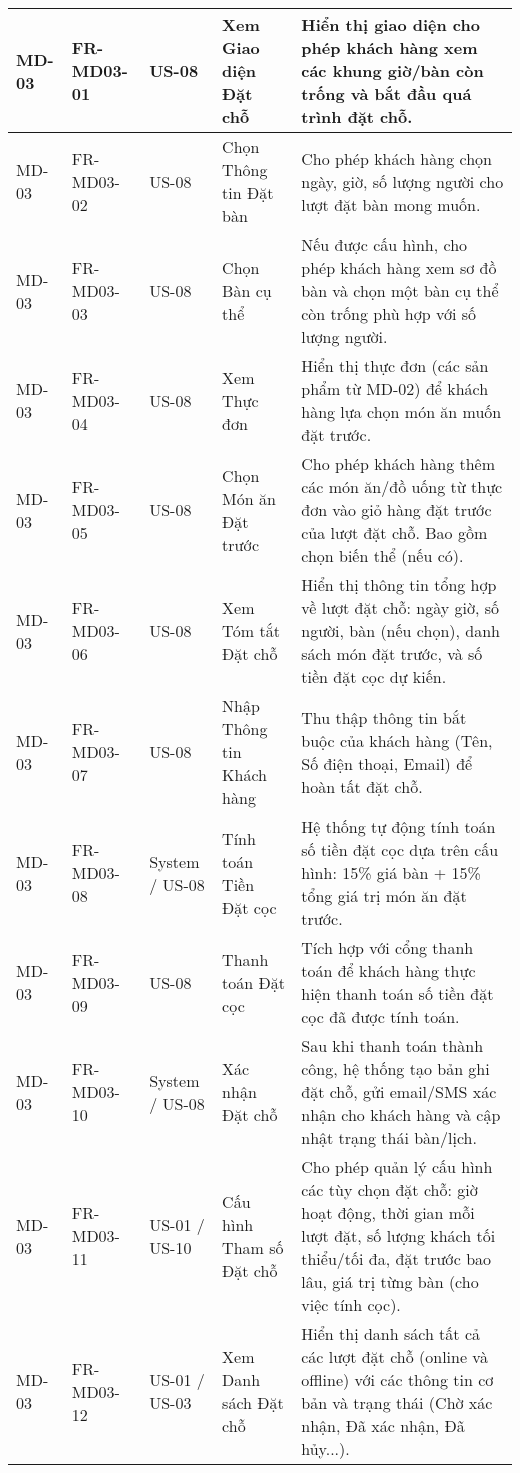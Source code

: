 \begin{longtable}{|m{2cm}|m{2.5cm}|m{2cm}|m{4.5cm}|m{4cm}|}
MD-03 & FR-MD03-01 & US-08 & Xem Giao diện Đặt chỗ & Hiển thị giao diện cho phép khách hàng xem các khung giờ/bàn còn trống và bắt đầu quá trình đặt chỗ. \\
\hline
MD-03 & FR-MD03-02 & US-08 & Chọn Thông tin Đặt bàn & Cho phép khách hàng chọn ngày, giờ, số lượng người cho lượt đặt bàn mong muốn. \\
\hline
MD-03 & FR-MD03-03 & US-08 & Chọn Bàn cụ thể & Nếu được cấu hình, cho phép khách hàng xem sơ đồ bàn và chọn một bàn cụ thể còn trống phù hợp với số lượng người. \\
\hline
MD-03 & FR-MD03-04 & US-08 & Xem Thực đơn & Hiển thị thực đơn (các sản phẩm từ MD-02) để khách hàng lựa chọn món ăn muốn đặt trước. \\
\hline
MD-03 & FR-MD03-05 & US-08 & Chọn Món ăn Đặt trước & Cho phép khách hàng thêm các món ăn/đồ uống từ thực đơn vào giỏ hàng đặt trước của lượt đặt chỗ. Bao gồm chọn biến thể (nếu có). \\
\hline
MD-03 & FR-MD03-06 & US-08 & Xem Tóm tắt Đặt chỗ & Hiển thị thông tin tổng hợp về lượt đặt chỗ: ngày giờ, số người, bàn (nếu chọn), danh sách món đặt trước, và số tiền đặt cọc dự kiến. \\
\hline
MD-03 & FR-MD03-07 & US-08 & Nhập Thông tin Khách hàng & Thu thập thông tin bắt buộc của khách hàng (Tên, Số điện thoại, Email) để hoàn tất đặt chỗ. \\
\hline
MD-03 & FR-MD03-08 & System / US-08 & Tính toán Tiền Đặt cọc & Hệ thống tự động tính toán số tiền đặt cọc dựa trên cấu hình: 15\% giá bàn + 15\% tổng giá trị món ăn đặt trước. \\
\hline
MD-03 & FR-MD03-09 & US-08 & Thanh toán Đặt cọc & Tích hợp với cổng thanh toán để khách hàng thực hiện thanh toán số tiền đặt cọc đã được tính toán. \\
\hline
MD-03 & FR-MD03-10 & System / US-08 & Xác nhận Đặt chỗ & Sau khi thanh toán thành công, hệ thống tạo bản ghi đặt chỗ, gửi email/SMS xác nhận cho khách hàng và cập nhật trạng thái bàn/lịch. \\
\hline
MD-03 & FR-MD03-11 & US-01 / US-10 & Cấu hình Tham số Đặt chỗ & Cho phép quản lý cấu hình các tùy chọn đặt chỗ: giờ hoạt động, thời gian mỗi lượt đặt, số lượng khách tối thiểu/tối đa, đặt trước bao lâu, giá trị từng bàn (cho việc tính cọc). \\
\hline
MD-03 & FR-MD03-12 & US-01 / US-03 & Xem Danh sách Đặt chỗ & Hiển thị danh sách tất cả các lượt đặt chỗ (online và offline) với các thông tin cơ bản và trạng thái (Chờ xác nhận, Đã xác nhận, Đã hủy...). \\

\end{longtable}
